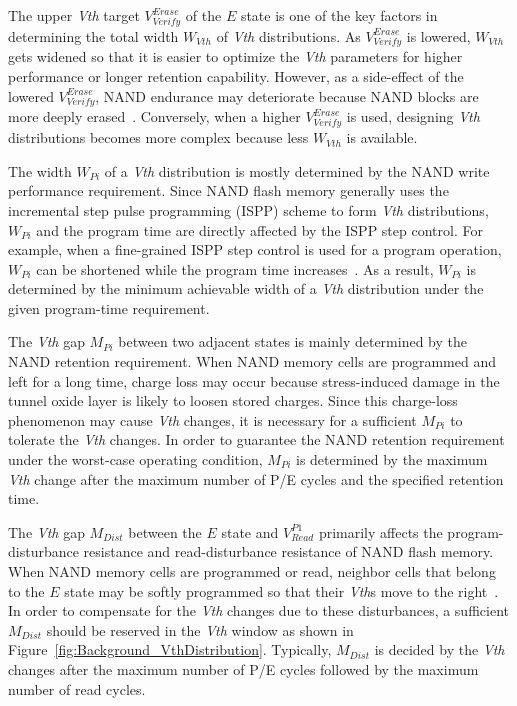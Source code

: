 The upper \textit{Vth} target {\small $V^{Erase}_{Verify}$} of the $E$ state is one of the key factors in determining the total width {\small$W_{Vth}$} of \textit{Vth} distributions.
As {\small $V^{Erase}_{Verify}$} is lowered, {\small $W_{Vth}$} gets widened so that it is easier to optimize the \textit{Vth} parameters for higher performance or longer retention capability.
However, as a side-effect of the lowered {\small $V^{Erase}_{Verify}$}, NAND endurance may deteriorate because NAND blocks are more deeply erased~\cite{DPES_jeong}.
Conversely, when a higher {\small $V^{Erase}_{Verify}$} is used, designing \textit{Vth} distributions becomes more complex because less {\small $W_{Vth}$} is available.


The width {\small $W_{Pi}$} of a \textit{Vth} distribution is mostly determined by the NAND write performance requirement.
Since NAND flash memory generally uses the incremental step pulse programming (ISPP) scheme to form \textit{Vth} distributions, {\small $W_{Pi}$} and the program time are directly affected by the ISPP step control.
For example, when a fine-grained ISPP step control is used for a program operation, {\small $W_{Pi}$} can be shortened while the program time increases~\cite{DPES_jeong}.
As a result, {\small $W_{Pi}$} is determined by the minimum achievable width of a \textit{Vth} distribution under the given program-time requirement.


The \textit{Vth} gap {\small $M_{Pi}$} between two adjacent states is mainly determined by the NAND retention requirement.
When NAND memory cells are programmed and left for a long time, charge loss may occur because stress-induced damage in the tunnel oxide layer is likely to loosen stored charges.
Since this charge-loss phenomenon may cause \textit{Vth} changes, it is necessary for a sufficient {\small $M_{Pi}$} to tolerate the \textit{Vth} changes.
In order to guarantee the NAND retention requirement under the worst-case operating condition, {\small $M_{Pi}$} is determined by the maximum \textit{Vth} change after the maximum number of P/E cycles and the specified retention time.


The \textit{Vth} gap {\small $M_{Dist}$} between the $E$ state and {\small $V_{Read}^{P1}$} primarily affects the program-disturbance resistance and read-disturbance resistance of NAND flash memory.
When NAND memory cells are programmed or read, neighbor cells that belong to the $E$ state may be softly programmed so that their \textit{Vth}s move to the right~\cite{Flash_Brewer}\cite{BER_mielke}.
In order to compensate for the \textit{Vth} changes due to these disturbances, a sufficient {\small $M_{Dist}$} should be reserved in the \textit{Vth} window as shown in Figure~\ref{fig:Background_VthDistribution}.
Typically, {\small $M_{Dist}$} is decided by the \textit{Vth} changes after the maximum number of P/E cycles followed by the maximum number of read cycles.



